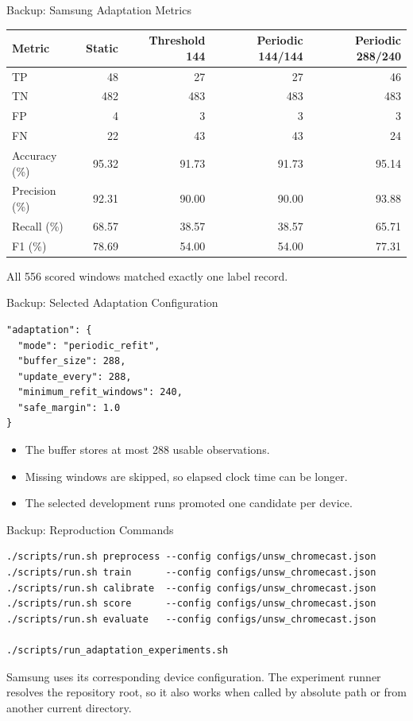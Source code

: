 \documentclass[aspectratio=169,10pt]{beamer}
\begin{document}
\begin{frame}{Backup: Samsung Adaptation Metrics}
\centering
\small
\begin{tabular}{@{}lrrrr@{}}
\toprule
\textbf{Metric} & \textbf{Static} & \textbf{Threshold 144} &
\textbf{Periodic 144/144} & \textbf{Periodic 288/240}\\
\midrule
TP & 48 & 27 & 27 & 46\\
TN & 482 & 483 & 483 & 483\\
FP & 4 & 3 & 3 & 3\\
FN & 22 & 43 & 43 & 24\\
Accuracy (\%) & 95.32 & 91.73 & 91.73 & 95.14\\
Precision (\%) & 92.31 & 90.00 & 90.00 & 93.88\\
Recall (\%) & 68.57 & 38.57 & 38.57 & 65.71\\
F1 (\%) & 78.69 & 54.00 & 54.00 & 77.31\\
\bottomrule
\end{tabular}

\vspace{0.55cm}
All 556 scored windows matched exactly one label record.
\end{frame}

\begin{frame}[fragile]{Backup: Selected Adaptation Configuration}
\begin{verbatim}
"adaptation": {
  "mode": "periodic_refit",
  "buffer_size": 288,
  "update_every": 288,
  "minimum_refit_windows": 240,
  "safe_margin": 1.0
}
\end{verbatim}

\begin{itemize}
  \item The buffer stores at most 288 usable observations.
  \item Missing windows are skipped, so elapsed clock time can be longer.
  \item The selected development runs promoted one candidate per device.
\end{itemize}
\end{frame}

\begin{frame}[fragile]{Backup: Reproduction Commands}
\small
\begin{verbatim}
./scripts/run.sh preprocess --config configs/unsw_chromecast.json
./scripts/run.sh train      --config configs/unsw_chromecast.json
./scripts/run.sh calibrate  --config configs/unsw_chromecast.json
./scripts/run.sh score      --config configs/unsw_chromecast.json
./scripts/run.sh evaluate   --config configs/unsw_chromecast.json

./scripts/run_adaptation_experiments.sh
\end{verbatim}

\small Samsung uses its corresponding device configuration. The experiment
runner resolves the repository root, so it also works when called by absolute
path or from another current directory.
\end{frame}
\end{document}
